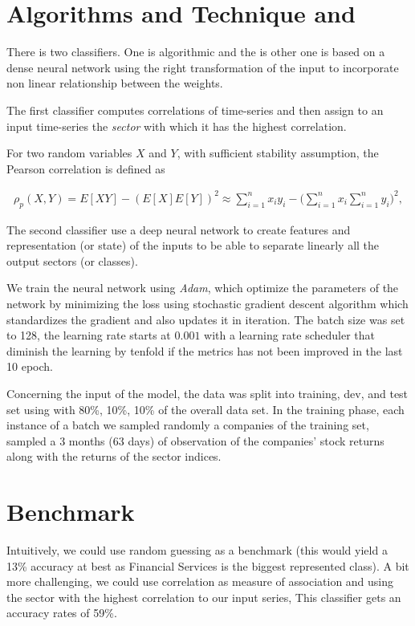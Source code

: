\documentclass[a4paper,twoside]{article}
\begin{document}
\section{Algorithms and Technique and}
\label{sec:org39dc0fc}

There is two classifiers. One is algorithmic and the is other one is based on
a dense neural network using the right transformation of the input to
incorporate non linear relationship between the weights.

The first classifier computes correlations of time-series and then assign to an
input time-series the \emph{sector} with which it has the highest correlation. 

For two random variables \(X\) and \(Y\), with sufficient stability assumption, the
Pearson correlation is defined as

\begin{align*}
  \rho_p(X, Y) = E[XY] - (E[X]E[Y])^2 \approx \sum_{i=1}^n x_iy_i - \Big(\sum_{i=1}^nx_i\sum_{i=1}^n y_i\Big)^2,
\end{align*}


The second classifier use a deep neural network to create features and
representation (or state) of the inputs to be able to separate linearly all
the output sectors (or classes).

We train the neural network using \emph{Adam}, which optimize the parameters of the
network by minimizing the loss using stochastic gradient descent algorithm
which standardizes the gradient and also updates it in iteration. The batch
size was set to 128, the learning rate starts at \(0.001\) with a learning rate
scheduler that diminish the learning by tenfold if the metrics has not been
improved in the last 10 epoch.

Concerning the input of the model, the data was split into training, dev, and
test set using with 80\%, 10\%, 10\% of the overall data set. In the training
phase, each instance of a batch we sampled randomly a companies of the training
set, sampled a 3 months (63 days) of observation of the companies' stock
returns along with the returns of the sector indices.

\section{Benchmark}
\label{sec:orgf060307}

Intuitively, we could use random guessing as a benchmark (this would yield a
13\% accuracy at best as Financial Services is the biggest represented class).
A bit more challenging, we could use correlation as measure of association and
using the sector with the highest correlation to our input series, This
classifier gets an accuracy rates of 59\%.
\end{document}
